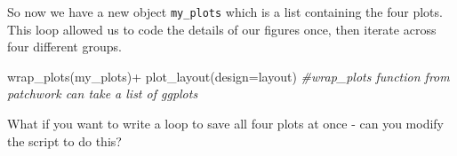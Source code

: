 \documentclass[
]{book}
\newenvironment{Shaded}{\begin{snugshade}}{\end{snugshade}}
\newcommand{\AttributeTok}[1]{\textcolor[rgb]{0.77,0.63,0.00}{#1}}
\newcommand{\CommentTok}[1]{\textcolor[rgb]{0.56,0.35,0.01}{\textit{#1}}}
\newcommand{\FunctionTok}[1]{\textcolor[rgb]{0.00,0.00,0.00}{#1}}
\newcommand{\NormalTok}[1]{#1}
\newcommand{\SpecialCharTok}[1]{\textcolor[rgb]{0.00,0.00,0.00}{#1}}
\begin{document}
So now we have a new object \texttt{my\_plots} which is a list containing the four plots. This loop allowed us to code the details of our figures once, then iterate across four different groups.

\begin{Shaded}
\begin{Highlighting}[]
\FunctionTok{wrap\_plots}\NormalTok{(my\_plots)}\SpecialCharTok{+}
  \FunctionTok{plot\_layout}\NormalTok{(}\AttributeTok{design=}\NormalTok{layout) }
\CommentTok{\#wrap\_plots function from patchwork can take a list of ggplots}
\end{Highlighting}
\end{Shaded}

What if you want to write a loop to save all four plots at once - can you modify the script to do this?
\end{document}
